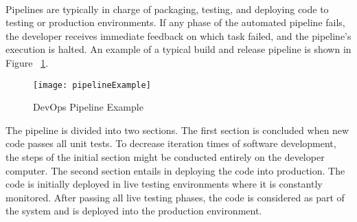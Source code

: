 \paragraph{}

Pipelines are typically in charge of packaging, testing, and deploying code to testing or production environments.
If any phase of the automated pipeline fails, the developer receives immediate feedback on which task failed, and the pipeline's execution is halted.
An example of a typical build and release pipeline is shown in Figure ~\ref{fig:pipeline_example}.

\begin{figure}[htbp]
    \centering
    \texttt{[image: pipelineExample]}
    \caption{DevOps Pipeline Example}
    \label{fig:pipeline_example}
\end{figure}

The pipeline is divided into two sections.
The first section is concluded when new code passes all unit tests.
To decrease iteration times of software development, the steps of the initial section might be conducted entirely on the developer computer.
The second section entails in deploying the code into production.
The code is initially deployed in live testing environments where it is constantly monitored.
After passing all live testing phases, the code is considered as part of the system and is deployed into the production environment.




